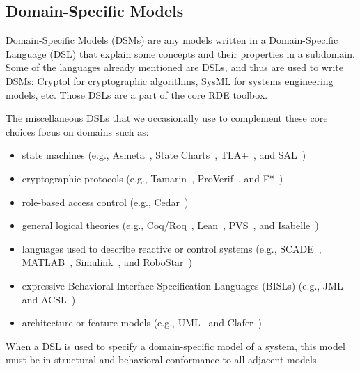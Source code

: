\documentclass[10pt,letterpaper]{article}
\begin{document}
\subsection{Domain-Specific Models}
\label{domain-specific-models}

Domain-Specific Models (DSMs) are any models written in a Domain-Specific Language (DSL) that explain some concepts and their properties in a subdomain. Some of the languages already mentioned are DSLs, and thus are used to write DSMs: Cryptol for cryptographic algorithms, SysML for systems engineering models, etc. Those DSLs are a part of the core RDE toolbox.

The miscellaneous DSLs that we occasionally use to complement these core choices focus on domains such as:

\begin{itemize}

    \item state machines (e.g., Asmeta~\cite{Asmeta}, State Charts~\cite{WelcomeWorld}, TLA+~\cite{LamportTLAHome}, and SAL~\cite{SymbolicAnalysis})

    \item cryptographic protocols (e.g., Tamarin~\cite{TamarinProver}, ProVerif~\cite{ProVerifCryptographic}, and F*~\cite{ProofOrientedProgramming})

    \item role-based access control (e.g., Cedar~\cite{AmazonWebServicesCedarPolicy})

    \item general logical theories (e.g., Coq/Roq~\cite{CoqProof}, Lean~\cite{LeanProgramming}, PVS~\cite{PrototypeVerification}, and Isabelle~\cite{Isabelle})

    \item languages used to describe reactive or control systems (e.g., SCADE~\cite{AnsysSCADE}, MATLAB~\cite{TheMathWorksInc.MATLAB}, Simulink~\cite{TheMathWorksInc.SimulinkSimulation}, and RoboStar~\cite{RoboStar})

    \item expressive Behavioral Interface Specification Languages (BISLs) (e.g., JML~\cite{OpenJML} and ACSL~\cite{ANSIISO})

    \item architecture or feature models (e.g., UML~\cite{UnifiedModeling} and Clafer~\cite{ClaferLightweight})

\end{itemize}

When a DSL is used to specify a domain-specific model of a system, this model must be in structural and behavioral conformance to all adjacent models.
\end{document}
